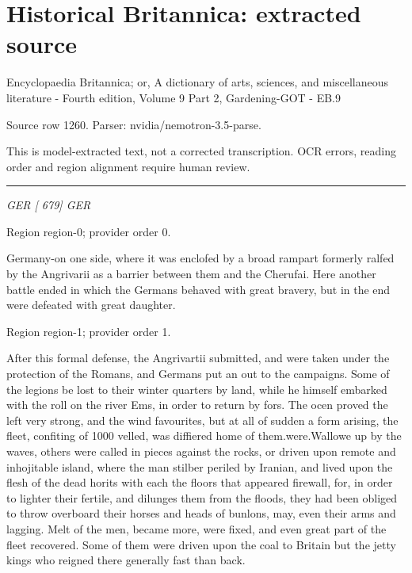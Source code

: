 \documentclass[11pt]{article}
\begin{document}
\section*{Historical Britannica: extracted source}
Encyclopaedia Britannica; or, A dictionary of arts, sciences, and miscellaneous literature - Fourth edition, Volume 9 Part 2, Gardening-GOT - EB.9\par
{\small Source row 1260. Parser: nvidia/nemotron-3.5-parse.\par}
{\small This is model-extracted text, not a corrected transcription. OCR errors, reading order and region alignment require human review.\par}
\hrule\medskip
{\small\itshape GER [ 679] GER\par}

{\scriptsize\color{gray} Region region-0; provider order 0.\par}
\medskip

Germany-on one side, where it was enclofed by a broad rampart formerly ralfed by the Angrivarii as a barrier between them and the Cherufai. Here another battle ended in which the Germans behaved with great bravery, but in the end were defeated with great daughter.
\par

{\scriptsize\color{gray} Region region-1; provider order 1.\par}
\medskip

After this formal defense, the Angrivartii submitted, and were taken under the protection of the Romans, and Germans put an out to the campaigns. Some of the legions be lost to their winter quarters by land, while he himself embarked with the roll on the river Ems, in order to return by fors. The ocen proved the left very strong, and the wind favourites, but at all of sudden a form arising, the fleet, confiting of 1000 velled, was diffiered home of them.were.Wallowe up by the waves, others were called in pieces against the rocks, or driven upon remote and inhojitable island, where the man stilber periled by Iranian, and lived upon the flesh of the dead horits with each the floors that appeared firewall, for, in order to lighter their fertile, and dilunges them from the floods, they had been obliged to throw overboard their horses and heads of bunlons, may, even their arms and lagging. Melt of the men, became more, were fixed, and even great part of the fleet recovered. Some of them were driven upon the coal to Britain but the jetty kings who reigned there generally fast than back.
\par
\end{document}
